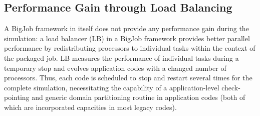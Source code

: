 \documentclass[preprint,12pt]{elsarticle}
\begin{document}
\subsection{Performance Gain through Load Balancing}

A BigJob framework in itself does not provide any performance gain during the simulation: a load balancer (LB) in a BigJob framework provides better parallel performance by redistributing processors to individual tasks within the context of the packaged job. LB measures the performance of individual tasks during a temporary stop and evolves application codes with a changed number of processors. Thus, each code is scheduled to stop and restart several times for the complete simulation, necessitating the capability of a application-level check-pointing and generic domain partitioning routine in application codes (both of which are incorporated capacities in most legacy codes).

\end{document}
